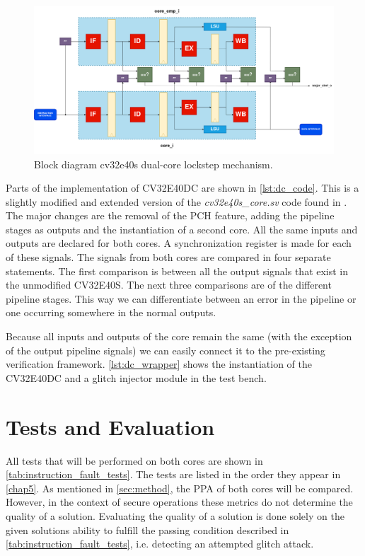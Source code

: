 \begin{figure}[ht!]
    \centering
    \includegraphics[width=\textwidth]{docs/images/dual_cores-block.png}
    \caption{Block diagram cv32e40s dual-core lockstep mechanism.}
    \label{fig:dual_block}
\end{figure}

Parts of the implementation of CV32E40DC are shown in \autoref{lst:dc_code}. This is a slightly modified and extended version of the \textit{cv32e40s\_core.sv} code found in \cite{cv32e40s_github}. The major changes are the removal of the PCH feature, adding the pipeline stages as outputs and the instantiation of a second core. All the same inputs and outputs are declared for both cores. A synchronization register is made for each of these signals. The signals from both cores are compared in four separate statements. The first comparison is between all the output signals that exist in the unmodified CV32E40S. The next three comparisons are of the different pipeline stages. This way we can differentiate between an error in the pipeline or one occurring somewhere in the normal outputs. 

Because all inputs and outputs of the core remain the same (with the exception of the output pipeline signals) we can easily connect it to the pre-existing verification framework. \autoref{lst:dc_wrapper} shows the instantiation of the CV32E40DC and a glitch injector module in the test bench.


\section{Tests and Evaluation}

All tests that will be performed on both cores are shown in \autoref{tab:instruction_fault_tests}. The tests are listed in the order they appear in \autoref{chap5}. As mentioned in \autoref{sec:method}, the PPA of both cores will be compared. However, in the context of secure operations these metrics do not determine the quality of a solution. Evaluating the quality of a solution is done solely on the given solutions ability to fulfill the passing condition described in \autoref{tab:instruction_fault_tests}, i.e. detecting an attempted glitch attack. 


